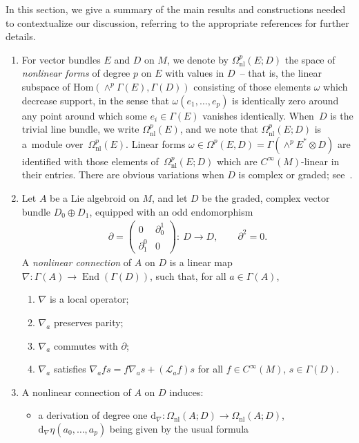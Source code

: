 \documentclass[pdftex]{sigma}
\numberwithin{equation}{section}
\newcommand{\rmap}{\longrightarrow}
\newcommand{\bd}{\partial}
\newcommand{\dd}{\mathrm{d}}
\newcommand{\8}{\infty}
\begin{document}
In this section, we give a summary of the main results and constructions needed to contextualize our discussion, referring to the appropriate references for further details.
\begin{enumerate}\itemsep=0pt
 \item For vector bundles $E$ and $D$ on $M$, we denote by $\Omega^p_{\mathrm{nl}}(E;D)$ the space of \emph{nonlinear forms} of degree $p$ on $E$ with values in $D$~-- that is, the linear subspace of $\mathrm{Hom}(\wedge^p\Gamma(E),\Gamma(D))$ consisting of those elements $\omega$ which decrease support, in the sense that $\omega(e_1,\dots ,e_p)$ is identically zero around any point around which some $e_i \in \Gamma(E)$ vanishes identically. When~$D$ is the trivial line bundle, we write $\Omega^p_{\mathrm{nl}}(E)$, and we note that $\Omega^p_{\mathrm{nl}}(E;D)$ is a~module over~$\Omega^p_{\mathrm{nl}}(E)$. Linear forms $\omega \in \Omega^p(E,D)=\Gamma(\wedge^pE^* \otimes D)$ are identified with those elements of~$\Omega^p_{\mathrm{nl}}(E;D)$ which are $C^{\8}(M)$-linear in their entries. There are obvious variations when $D$ is complex or graded; see~\cite{AbadCrainic,CrainicNL}.
 \item Let $A$ be a Lie algebroid on $M$, and let $D$ be the graded, complex vector bundle $D_0 \oplus D_1$, equipped with an odd endomorphism
\begin{gather*}
 \bd = \left(\begin{matrix}
 0 & \bd^1_0 \\
 \bd^0_1 & 0
 \end{matrix}\right) \colon \ D \rmap D, \qquad \bd^2 = 0.
\end{gather*}A \emph{nonlinear connection} of $A$ on $D$ is a linear map $\nabla \colon \Gamma(A) \to \operatorname{End}(\Gamma(D))$, such that, for all $a \in \Gamma(A)$,
\begin{enumerate}\itemsep=0pt
\item[a)] $\nabla$ is a local operator;
 \item[b)] $\nabla_a$ preserves parity;
 \item[c)] $\nabla_a$ commutes with $\bd$;
 \item[d)] $\nabla_a$ satisfies $\nabla_a fs = f\nabla_as+ (\mathscr{L}_af)s$ for all $f \in C^{\8}(M)$, $s \in \Gamma(D)$.
\end{enumerate}
\item A nonlinear connection of $A$ on $D$ induces:
\begin{itemize}\itemsep=0pt
 \item a derivation of degree one $\dd_{\nabla}\colon \Omega_{\mathrm{nl}}(A;D) \to \Omega_{\mathrm{nl}}(A;D)$, $\dd_{\nabla}\eta(a_0,\dots ,a_p)$ being given by the usual formula

\end{itemize}
\end{enumerate}
\end{document}
